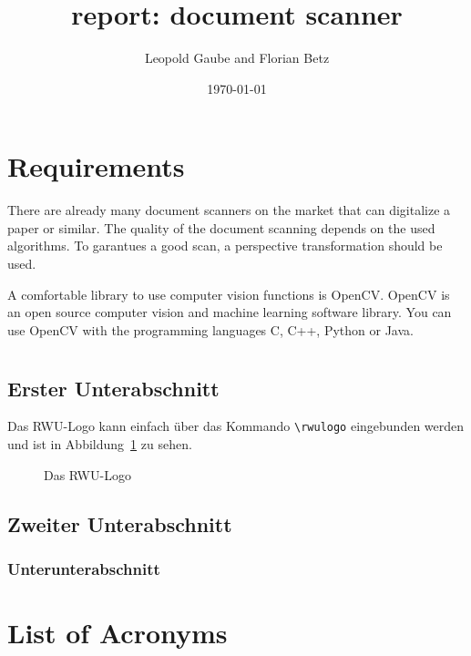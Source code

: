 \documentclass[bibliography=totoc]{scrartcl}
\title{report: document scanner}
\author{Leopold Gaube and Florian Betz}
\date{\today}
\begin{document}
	\maketitle
	\tableofcontents

	\clearpage

	\section{Requirements}

		There are already many document scanners on the market that can digitalize a paper or similar. 
		The quality of the document scanning depends on the used algorithms.
		To garantues a good scan, a perspective transformation should be used.
		
	    A comfortable library to use computer vision functions is \ac{OpenCV}.
	    \ac{OpenCV} is an open source computer vision and machine learning software library. \cite{OpenCV}
	    You can use OpenCV with the programming languages C, C++, Python or Java.
	    
	    
	    

    \section{}
		\subsection{Erster Unterabschnitt}

			Das RWU-Logo kann einfach über das Kommando
			\verb?\rwulogo? eingebunden werden und ist in
			Abbildung~\ref{fig:logo} zu sehen.

			\begin{figure}[hb]
				\centering
				\rwulogo[width=0.5\columnwidth]
				\caption{Das RWU-Logo}
				\label{fig:logo}
			\end{figure}

		\subsection{Zweiter Unterabschnitt}

			\lipsum[1]

			\subsubsection{Unterunterabschnitt}

			\lipsum[2-5]
			
\section*{List of Acronyms} 

\begin{acronym}[....]
\end{acronym}
			

\end{document}

